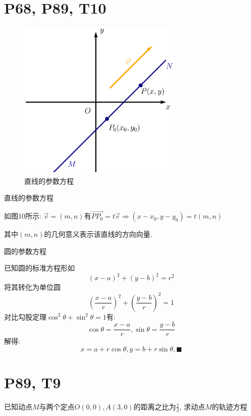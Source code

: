 \documentclass{book}
\begin{document}
        \section{\textcolor[rgb]{0.11,0.65,0.52}{P68, P89, T10}}
        \begin{figure}[htbp]
            \centering
            \includegraphics[width=0.7\textwidth]{img/ArgumentFunctions.eps}
            \caption{直线的参数方程}
        \end{figure}
        \textcolor[rgb]{0.38,0.11,0.2}{直线的参数方程}

        如图10所示: $\overrightarrow{v}=\left( m, n \right)$有$\overrightarrow{PP_0}=t\overrightarrow{v}\Longrightarrow  \left( x-x_0, y-y_0 \right)=t\left( m,n \right)$

        其中$(m,n)$的几何意义表示该直线的方向向量.

        \textcolor[rgb]{0.38,0.11,0.2}{圆的参数方程}

        已知圆的标准方程形如$$\displaystyle \left( x-a \right)^2+\left( y-b \right)^2=r^2$$
        将其转化为\textcolor[rgb]{0.75,0.17,0.22}{单位圆}$$\left( \frac{x-a}{r} \right)^2+\left( \frac{y-b}{r} \right)^2=1$$
        \textcolor[rgb]{0.75,0.17,0.22}{对比勾股定理}$\cos^2\theta +\sin^2\theta=1$有:
        $$\cos \theta =\frac{x-a}{r},\sin \theta=\frac{y-b}{r}$$
        解得:$$x=a+r\cos \theta,y=b+r\sin \theta, \blacksquare$$

        \section{\textcolor[rgb]{0.11,0.65,0.52}{P89, T9}}
        
        \begin{boxB}
            已知动点$M$与两个定点$O\left( 0,0 \right),A\left( 3,0 \right)$的距离之比为$\displaystyle \frac{1}{2}$, 求动点$M$的轨迹方程
        \end{boxB}
\end{document}
